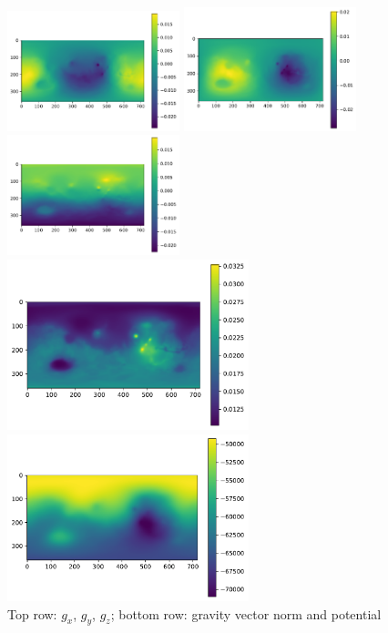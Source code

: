 \begin{center}
\includegraphics[width=5cm]{python_codes/fieldstone_100/results/half/gx}
\includegraphics[width=5cm]{python_codes/fieldstone_100/results/half/gy}
\includegraphics[width=5cm]{python_codes/fieldstone_100/results/half/gz}\\
\includegraphics[width=7cm]{python_codes/fieldstone_100/results/half/gg}
\includegraphics[width=7cm]{python_codes/fieldstone_100/results/half/UU}\\
{\captionfont Top row: $g_x$, $g_y$, $g_z$;
bottom row: gravity vector norm and potential}
\end{center}


